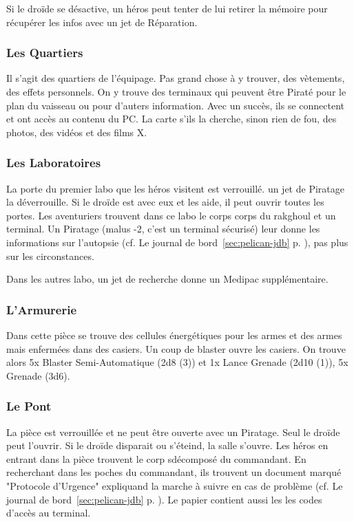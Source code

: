 \documentclass{jdrp}
\begin{document}
Si le droïde se désactive, un héros peut tenter de lui retirer la mémoire pour récupérer les infos avec un jet de Réparation. 

\subsubsection{Les Quartiers}
Il s'agit des quartiers de l'équipage. Pas grand chose à y trouver, des vètements, des effets personnels. On y trouve des terminaux qui peuvent être Piraté pour le plan du vaisseau ou pour d'auters information. Avec un succès, ils se connectent et ont accès au contenu du PC. La carte s'ils la cherche, sinon rien de fou, des photos, des vidéos et des films X.

\subsubsection{Les Laboratoires}
La porte du premier labo que les héros visitent est verrouillé. un jet de Piratage la déverrouille. Si le droïde est avec eux et les aide, il peut ouvrir toutes les portes. Les aventuriers trouvent dans ce labo le corps corps du rakghoul et un terminal. Un Piratage (malus -2, c'est un terminal sécurisé) leur donne les informations sur l'autopsie (cf. Le journal de bord~\ref{sec:pelican-jdb} p. \pageref{sec:pelican-jdb}), pas plus sur les circonstances.

Dans les autres labo, un jet de recherche donne un Medipac supplémentaire.

\subsubsection{L'Armurerie}
Dans cette pièce se trouve des cellules énergétiques pour les armes et des armes mais enfermées dans des casiers. Un coup de blaster ouvre les casiers. On trouve alors 5x Blaster Semi-Automatique (2d8 (3)) et 1x Lance Grenade (2d10 (1)), 5x Grenade (3d6).


\subsubsection{Le Pont}
La pièce est verrouillée et ne peut être ouverte avec un Piratage. Seul le droïde peut l'ouvrir. Si le droïde disparait ou s'éteind, la salle s'ouvre. Les héros en entrant dans la pièce trouvent le corp sdécomposé du commandant. En recherchant dans les poches du commandant, ils trouvent un document marqué "Protocole d'Urgence" expliquand la marche à suivre en cas de problème (cf. Le journal de bord~\ref{sec:pelican-jdb} p. \pageref{sec:pelican-jdb}). Le papier contient aussi les les codes d'accès au terminal.
\end{document}
